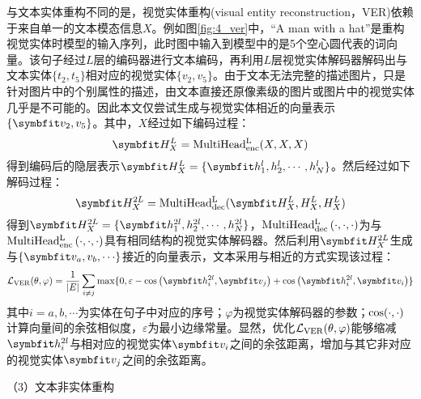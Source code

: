 
与文本实体重构不同的是，视觉实体重构(visual entity reconstruction，VER)依赖于来自单一的文本模态信息$X$。例如图\ref{fig:4_ver}中，“A man with a hat”是重构视觉实体时模型的输入序列，此时图中输入到模型中的是5个空心圆代表的词向量。该句子经过$L$层的编码器进行文本编码，再利用$L$层视觉实体解码器解码出与文本实体$\{t_2,t_5\}$相对应的视觉实体$\{v_2,v_5\}$。由于文本无法完整的描述图片，只是针对图片中的个别属性的描述，由文本直接还原像素级的图片或图片中的视觉实体几乎是不可能的。因此本文仅尝试生成与视觉实体相近的向量表示$\{\Vector{v_2,v_5}\}$。其中，$X$经过如下编码过程：
\begin{equation}
\Vector{H_X^L}={\rm{MultiHead_{enc}^L}}(X, X, X)
\end{equation}
得到编码后的隐层表示$\Vector{H_X^L}=\{\Vector{h_1^l,h_2^l,\cdots,h_N^l}\}$。然后经过如下解码过程：
\begin{equation}
\Vector{H_X^{2L}}={\rm{MultiHead_{dec}^L}}(\Vector{H_X^L, H_X^L, H_X^L})
\end{equation}
得到$\Vector{H_X^{2L}}=\{\Vector{h_1^{2l},h_2^{2l},\cdots,h_N^{2l}}\}$，${\rm MultiHead_{dec}^L}\left( \cdot,\cdot,\cdot \right)$为与${\rm MultiHead_{enc}^L}\left( \cdot,\cdot,\cdot \right)$具有相同结构的视觉实体解码器。然后利用$\Vector{H_X^{2L}}$生成与$\{\Vector{v_a,v_b,\cdots}\}$接近的向量表示，文本采用与相近的方式实现该过程：
\begin{equation}
\mathcal{L}_{\rm{VER}}(\theta, \varphi)=
    \frac{1}{{\vert}E{\vert}}
    \mathop{\sum}_{i \neq j}{\max}\{0, \varepsilon - {\rm{cos}}\left( \Vector{h_i^{2l}}, \Vector{v_j} \right) + {\rm{cos}}\left( \Vector{h_i^{2l}}, \Vector{v_i} \right)\}
\end{equation}
%
其中$i=a,b,\cdots$为实体在句子中对应的序号；$\varphi$为视觉实体解码器的参数；${\rm{cos}}(\cdot,\cdot)$计算向量间的余弦相似度，$\varepsilon$为最小边缘常量。显然，优化$\mathcal{L}_{\rm{VER}}(\theta,\varphi)$能够缩减$\Vector{h_i^{2l}}$与相对应的视觉实体$\Vector{v_i}$之间的余弦距离，增加与其它非对应的视觉实体$\Vector{v_j}$之间的余弦距离。

{\sffamily （3）文本非实体重构}

